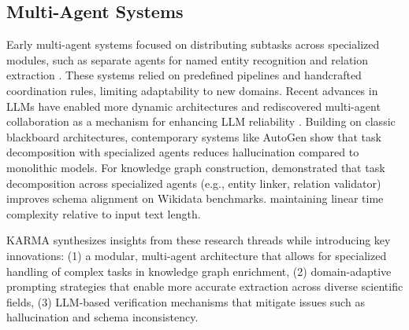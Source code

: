 \subsection{Multi-Agent Systems}
Early multi-agent systems focused on distributing subtasks across specialized modules, such as separate agents for named entity recognition and relation extraction \cite{carvalho1998multi}. These systems relied on predefined pipelines and handcrafted coordination rules, limiting adaptability to new domains. Recent advances in LLMs have enabled more dynamic architectures and rediscovered multi-agent collaboration as a mechanism for enhancing LLM reliability \cite{talebirad2023multi,lu2024clinicalrag}. Building on classic blackboard architectures, contemporary systems like AutoGen \cite{wu2023autogen} show that task decomposition with specialized agents reduces hallucination compared to monolithic models. For knowledge graph construction, \cite{liang2023encouraging} demonstrated that task decomposition across specialized agents (e.g., entity linker, relation validator) improves schema alignment on Wikidata benchmarks. maintaining linear time complexity relative to input text length.

KARMA synthesizes insights from these research threads while introducing key innovations: (1) a modular, multi-agent architecture that allows for specialized handling of complex tasks in knowledge graph enrichment, (2) domain-adaptive prompting strategies that enable more accurate extraction across diverse scientific fields, (3) LLM-based verification mechanisms that mitigate issues such as hallucination and schema inconsistency.